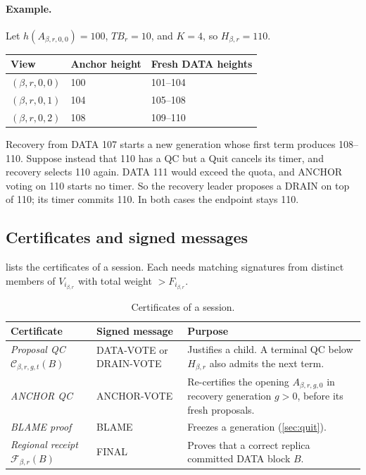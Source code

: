 \documentclass[11pt,a4paper]{article}
\newcommand{\QC}{\mathcal C}
\newcommand{\FC}{\mathcal F}
\newcommand{\TB}{\mathit{TB}}
\newcommand{\defterm}[1]{\textcolor{rrBlue}{\textit{#1}}}
\begin{document}
\paragraph{Example.}
Let $h(A_{\beta,r,0,0})=100$, $\TB_r=10$, and $K=4$, so $H_{\beta,r}=110$.
\begin{center}\small
\begin{tabular}{@{}lll@{}}\toprule
View & Anchor height & Fresh DATA heights\\\midrule
$(\beta,r,0,0)$ & 100 & 101--104\\
$(\beta,r,0,1)$ & 104 & 105--108\\
$(\beta,r,0,2)$ & 108 & 109--110\\\bottomrule
\end{tabular}
\end{center}
Recovery from DATA 107 starts a new generation whose first term produces
108--110. Suppose instead that 110 has a QC but a Quit cancels its timer,
and recovery selects 110 again. DATA 111 would exceed the quota, and
ANCHOR voting on 110 starts no timer. So the recovery leader proposes a
DRAIN on top of 110; its timer commits 110. In both cases the endpoint
stays 110.

\subsection{Certificates and signed messages}
\label{sec:certificates}
 lists the certificates of a session. Each needs
matching signatures from distinct members of $V_{i_{\beta,r}}$ with total
weight $>F_{i_{\beta,r}}$.

\begin{table}[htbp]\centering\small
\caption{Certificates of a session.}
\label{tab:certificates}
\begin{tabularx}{\linewidth}{@{}>{\raggedright\arraybackslash}p{.25\linewidth}>{\raggedright\arraybackslash}p{.24\linewidth}Y@{}}
\toprule
Certificate & Signed message & Purpose\\
\midrule
\defterm{Proposal QC} $\QC_{\beta,r,g,t}(B)$ & DATA-VOTE or DRAIN-VOTE & Justifies a
child. A terminal QC below $H_{\beta,r}$ also admits the next term.\\
\defterm{ANCHOR QC} & ANCHOR-VOTE & Re-certifies the opening $A_{\beta,r,g,0}$ in
recovery generation $g>0$, before its fresh proposals.\\
\defterm{BLAME proof} & BLAME & Freezes a generation (\cref{sec:quit}).\\
\defterm{Regional receipt} $\FC_{\beta,r}(B)$ & FINAL & Proves that a correct replica
committed DATA block $B$.\\
\bottomrule
\end{tabularx}
\end{table}
\end{document}
